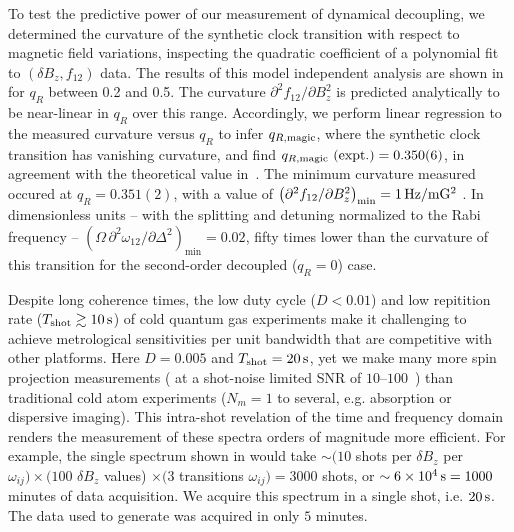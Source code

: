 \documentclass[aps,prl,reprint,superscriptaddress,floatfix]{revtex4-1}
\begin{document}
To test the predictive power of our measurement of dynamical decoupling, we determined the curvature of the synthetic clock transition with respect to magnetic field variations, inspecting the quadratic coefficient of a polynomial fit to $(\delta B_z, f_{12})$ data.
The results of this model independent analysis are shown in~ for $q_R$ between 0.2 and 0.5.
The curvature $\partial^2 f_{12}/\partial B_z^2$ is predicted analytically to be near-linear in $q_R$ over this range.
Accordingly, we perform linear regression to the measured curvature versus $q_R$ to infer $q_{R,\text{magic}}$, where the synthetic clock transition has vanishing curvature, and find $q_{R,\text{magic}}\text{ (expt.)} = 0.350(6)$, in agreement with the theoretical value in~.
The minimum curvature measured occured at $q_R = 0.351(2)$, with a value of $\left(\partial^2 f_{12}/\partial B_z^2\right)_{\text{min}} = \unit[1]{Hz/mG^2}$ .
In dimensionless units -- with the splitting and detuning normalized to the Rabi frequency -- $\left(\Omega\, \partial^2\omega_{12}/\partial \Delta^2\right)_{\text{min}} = 0.02$, fifty times lower than the curvature of this transition for the second-order decoupled ($q_R = 0$) case.

Despite long coherence times, the low duty cycle ($D < 0.01$) and low repitition rate ($T_\text{shot} \gtrsim \unit[10]{s}$) of cold quantum gas experiments make it challenging to achieve metrological sensitivities per unit bandwidth that are competitive with other platforms.
Here $D=0.005$ and $T_\text{shot} = \unit[20]{s}$, yet we make many more spin projection measurements ( at a shot-noise limited SNR of $10$--$100$~\cite{jasperse_magic-wavelength_2017}) than traditional cold atom experiments ($N_m = 1$ to several, e.g. absorption or dispersive imaging).
This intra-shot revelation of the time and frequency domain renders the measurement of these spectra orders of magnitude more efficient.
For example, the single spectrum shown in  would take $\sim (10$ shots per $\delta B_z$ per $\omega_{ij} ) \times (100$ $\delta B_z$ values) $\times (3 $ transitions $\omega_{ij}) = 3000$ shots, or $\sim \unit[6\times10^4]{s} = 1000$ minutes of data acquisition.
We acquire this spectrum in a single shot, i.e. $\unit[20]{s}$.
The data used to generate  was acquired in only $5$ minutes.
\end{document}
